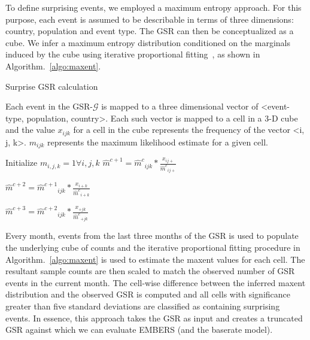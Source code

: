 \documentclass[11pt,a4paper,extrafontsizes,oneside]{article}
\begin{document}
To define surprising events,
we employed a maximum entropy approach. For this purpose, each event is assumed
to be describable
in terms of three dimensions: country, population and event type. The GSR can then be conceptualized
as a cube. We infer a maximum entropy distribution conditioned on the marginals
induced by the cube using iterative proportional fitting~\cite{bishop2007discrete}, as shown in Algorithm.~\ref{algo:maxent}.
\begin{algorithm}
\caption{Surprise GSR calculation}
\begin{algorithmic}[1]


\State Each event in the GSR-$\mathcal{G}$ is mapped to a three dimensional vector of <event-type, population, country>. Each such vector
       is mapped to a cell in a 3-D cube and the value $x_{ijk}$ for a cell in the cube represents the frequency of the vector <i, j, k>.
       $m_{ijk}$ represents the maximum likelihood estimate for a given cell.

\State Initialize $m_{i,j,k}=1 \forall i,j,k$
\State $\hat{m}^{c+1} = {\hat{m}^c}_{ijk}*\frac{x_{ij+}}{{\hat{m}^c}_{ij+}} $

\State $\hat{m}^{c+2} = {\hat{m}^{c+1}}_{ijk}*\frac{x_{i+k}}{{\hat{m}^c}_{i+k}} $

\State $\hat{m}^{c+3} = {\hat{m}^{c+2}}_{ijk}*\frac{x_{+jk}}{{\hat{m}^c}_{+jk}} $

\EndFor



\EndIf

\EndFor


\EndProcedure

\end{algorithmic}

\label{algo:maxent}
\end{algorithm}


Every month, events from the last three months of the
GSR is used to populate the underlying cube of counts and the iterative proportional fitting procedure in Algorithm.~\ref{algo:maxent} is
used to estimate the maxent values for each cell. The resultant sample counts are then scaled to
match the observed number of GSR events in the current month. The cell-wise difference between the inferred
maxent distribution and the observed GSR is computed and all cells with significance greater than five standard
deviations are classified as containing surprising events. In essence, this approach takes the GSR as input and
creates a truncated GSR against which we can evaluate EMBERS (and the baserate model).
\end{document}
